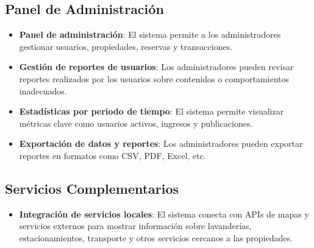	\subsection{Panel de Administración}
		\begin{itemize}
			\item \textbf{Panel de administración}: El sistema permite a los administradores gestionar usuarios, propiedades, reservas y transacciones.
			\item \textbf{Gestión de reportes de usuarios}: Los administradores pueden revisar reportes realizados por los usuarios sobre contenidos o comportamientos inadecuados.
			\item \textbf{Estadísticas por periodo de tiempo}: El sistema permite visualizar métricas clave como usuarios activos, ingresos y publicaciones.
			\item \textbf{Exportación de datos y reportes}: Los administradores pueden exportar reportes en formatos como CSV, PDF, Excel, etc.
		\end{itemize}
	
	\subsection{Servicios Complementarios}
		\begin{itemize}
			\item \textbf{Integración de servicios locales}: El sistema conecta con APIs de mapas y servicios externos para mostrar información sobre lavanderías, estacionamientos, transporte y otros servicios cercanos a las propiedades.
		\end{itemize}